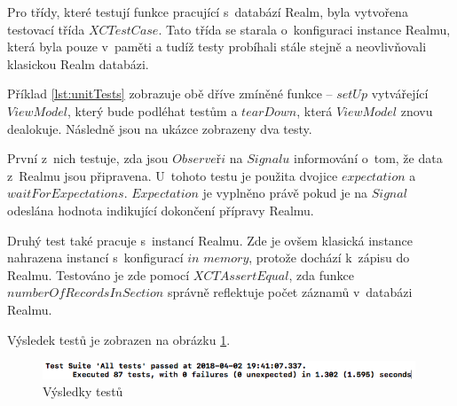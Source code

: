 \documentclass[thesis=M,czech]{FITthesis}[2012/06/26]
\begin{document}
Pro třídy, které testují funkce pracující s~databází Realm, byla vytvořena testovací třída $XCTestCase$. Tato třída se starala o~konfiguraci instance Realmu, která byla pouze v~paměti a tudíž testy probíhali stále stejně a neovlivňovali klasickou Realm databázi.

Příklad \ref{lst:unitTests} zobrazuje obě dříve zmíněné funkce -- $setUp$ vytvářející $ViewModel$, který bude podléhat testům a $tearDown$, která $ViewModel$ znovu dealokuje. Následně jsou na ukázce zobrazeny dva testy. 

První z~nich testuje, zda jsou $Observeři$ na $Signalu$ informování o~tom, že data z~Realmu jsou připravena. U~tohoto testu je použita dvojice $expectation$ a $waitForExpectations$. $Expectation$ je vyplněno právě pokud je na $Signal$ odeslána hodnota indikující dokončení přípravy Realmu. 

Druhý test také pracuje s~instancí Realmu. Zde je ovšem klasická instance nahrazena instancí s~konfigurací $in$ $memory$, protože dochází k~zápisu do Realmu. Testováno je zde pomocí $XCTAssertEqual$, zda funkce $numberOfRecordsInSection$ správně reflektuje počet záznamů v~databázi Realmu.

Výsledek testů je zobrazen na obrázku \ref{fig:testsResult}.

\begin{figure}[]\centering
 \includegraphics[width=0.99\textwidth]{./pictures/tests}
 \caption[Výsledky testů]{Výsledky testů}\label{fig:testsResult}
\end{figure}
\end{document}
